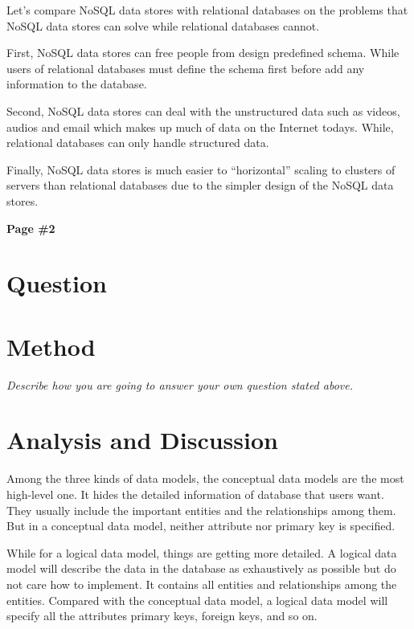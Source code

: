 \documentclass[12pt, a4paper]{article}
\begin{document}
Let's compare NoSQL data stores with relational databases on the problems that NoSQL data stores can solve while relational databases cannot.

First, NoSQL data stores can free people from design predefined schema. While users of relational databases must define the schema first before add any information to the database.\cite{diff}

Second, NoSQL data stores can deal with the unstructured data such as videos, audios and email which makes up much of data on the Internet todays. While, relational databases can only handle structured data.\cite{diff}

Finally, NoSQL data stores is much easier to ``horizontal'' scaling to clusters of servers than relational databases due to the simpler design of the NoSQL data stores.\cite{wiki}


\newpage

\begin{center}
{\textbf{
Page \#2}}
\end{center}

\section{Question}



\section{Method}

{\emph{Describe how you are going to answer your own question stated above.}}

\section{Analysis and Discussion}

Among the three kinds of data models, the conceptual data models are the most high-level one. It hides the detailed information of database that users want. They usually include the important entities and the relationships among them. But in a conceptual data model, neither attribute nor primary key is specified.

While for a logical data model, things are getting more detailed. A logical data model will describe the data in the database as exhaustively as possible but do not care how to implement. It contains all entities and relationships among the entities. Compared with the conceptual data model, a logical data model will specify all the attributes primary keys, foreign keys, and so on.
\end{document}
